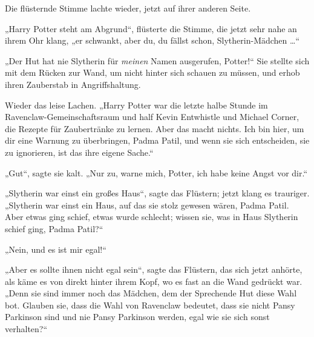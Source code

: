 Die flüsternde Stimme lachte wieder, jetzt auf ihrer anderen Seite.

„Harry Potter steht am Abgrund“, flüsterte die Stimme, die jetzt sehr nahe an ihrem Ohr klang, „er schwankt, aber du, du fällst schon, Slytherin-Mädchen …“

„Der Hut hat nie Slytherin für \emph{meinen} Namen ausgerufen, Potter!“ Sie stellte sich mit dem Rücken zur Wand, um nicht hinter sich schauen zu müssen, und erhob ihren Zauberstab in Angriffshaltung.

Wieder das leise Lachen.
„Harry Potter war die letzte halbe Stunde im Ravenclaw-Gemeinschaftsraum und half Kevin Entwhistle und Michael Corner, die Rezepte für Zaubertränke zu lernen. Aber das macht nichts. Ich bin hier, um dir eine Warnung zu überbringen, Padma Patil, und wenn sie sich entscheiden, sie zu ignorieren, ist das ihre eigene Sache.“

„Gut“, sagte sie kalt.
„Nur zu, warne mich, Potter, ich habe keine Angst vor dir.“

„Slytherin war einst ein großes Haus“, sagte das Flüstern; jetzt klang es trauriger.
„Slytherin war einst ein Haus, auf das sie stolz gewesen wären, Padma Patil. Aber etwas ging schief, etwas wurde schlecht; wissen sie, was in Haus Slytherin schief ging, Padma Patil?“

„Nein, und es ist mir egal!“

„Aber es sollte ihnen nicht egal sein“, sagte das Flüstern, das sich jetzt anhörte, als käme es von direkt hinter ihrem Kopf, wo es fast an die Wand gedrückt war.
„Denn sie sind immer noch das Mädchen, dem der Sprechende Hut diese Wahl bot. Glauben sie, dass die Wahl von Ravenclaw bedeutet, dass sie nicht Pansy Parkinson sind und nie Pansy Parkinson werden, egal wie sie sich sonst verhalten?“


